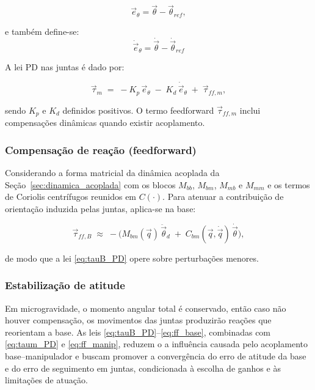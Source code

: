 \begin{equation}
\vec e_\theta=\vec\theta-\vec\theta_{ref},
\end{equation}

e também define-se:
\begin{equation}
\dot{\vec e}_\theta=\dot{\vec\theta}-\dot{\vec\theta}_{ref}\end{equation}

A lei PD nas juntas é dado por:

\begin{equation}
\label{eq:taum_PD}
\vec\tau_m \;=\; -K_p\,\vec e_\theta \;-\; K_d\,\dot{\vec e}_\theta \;+\; \vec\tau_{ff,m},
\end{equation}

sendo $K_p$ e $K_d$ definidos positivos.
O termo feedforward $\vec\tau_{ff,m}$ inclui compensações dinâmicas quando existir acoplamento.

\subsubsection{Compensação de reação (feedforward)}

Considerando a forma matricial da dinâmica acoplada da Seção~\eqref{sec:dinamica_acoplada} com os blocos $M_{bb}$, $M_{bm}$, $M_{mb}$ e $M_{mm}$ e os termos de Coriolis centrífugos reunidos em $C(\cdot)$.
Para atenuar a contribuição de orientação induzida pelas juntas, aplica-se na base:

\begin{equation}
\label{eq:ff_base}
\vec\tau_{ff,B} \;\approx\; -\Big( M_{bm}(\vec q)\,\ddot{\vec\theta}_d \;+\; C_{bm}(\vec q,\dot{\vec q})\,\dot{\vec\theta} \Big),
\end{equation}

de modo que a lei \eqref{eq:tauB_PD} opere sobre perturbações menores.

\subsubsection{Estabilização de atitude}
Em microgravidade, o momento angular total é conservado, então caso não houver compensação, os movimentos das juntas produzirão reações que reorientam a base.
As leis \eqref{eq:tauB_PD}--\eqref{eq:ff_base}, combinadas com \eqref{eq:taum_PD} e \eqref{eq:ff_manip}, reduzem o a influência causada pelo acoplamento base--manipulador e buscam promover a convergência do erro de atitude da base e do erro de seguimento em juntas, condicionada à escolha de ganhos e às limitações de atuação.